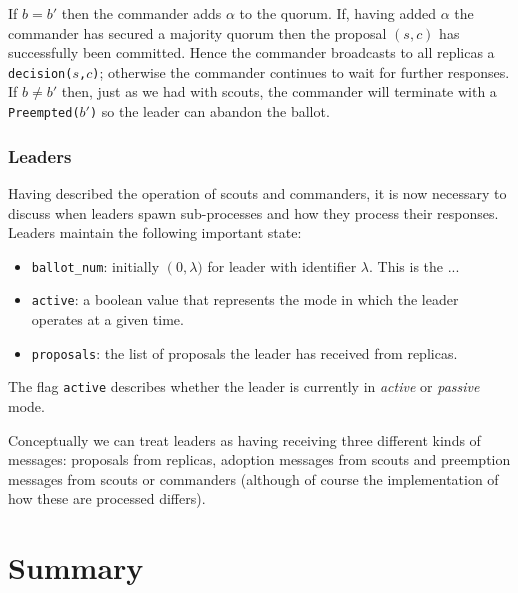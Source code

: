 If $b = b'$ then the commander adds $\alpha$ to the quorum. If, having added $\alpha$ the commander has secured a majority quorum then the proposal $(s,c)$ has successfully been committed. Hence the commander broadcasts to all replicas a \texttt{decision($s$,$c$)}; otherwise the commander continues to wait for further responses. \\

If $b \neq b'$ then, just as we had with scouts, the commander will terminate with a  \texttt{Preempted($b'$)} so the leader can abandon the ballot.

\subsubsection{Leaders}

Having described the operation of scouts and commanders, it is now necessary to discuss when leaders spawn sub-processes and how they process their responses. Leaders maintain the following important state:

\begin{itemize}
  \item \texttt{ballot\_num}: initially $\left(0,\lambda)$ for leader with identifier $\lambda$. This is the ...
  \item \texttt{active}: a boolean value that represents the mode in which the leader operates at a given time.
  \item \texttt{proposals}: the list of proposals the leader has received from replicas.
\end{itemize}

The flag \texttt{active} describes whether the leader is currently in \emph{active} or \emph{passive} mode.

Conceptually we can treat leaders as having receiving three different kinds of messages: proposals from replicas, adoption messages from scouts and preemption messages from scouts or commanders (although of course the implementation of how these are processed differs).

\section{Summary}






















